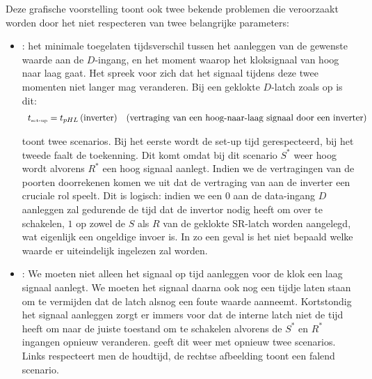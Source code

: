 Deze grafische voorstelling toont ook twee bekende problemen die veroorzaakt worden door het niet respecteren van twee belangrijke parameters:
\begin{itemize}
 \item {}: het minimale toegelaten tijdsverschil tussen het aanleggen van de gewenste waarde aan de $D$-ingang, en het moment waarop het kloksignaal van hoog naar laag gaat. Het spreek voor zich dat het signaal tijdens deze twee momenten niet langer mag veranderen. Bij een geklokte $D$-latch zoals op  is dit:
\begin{equation}
\begin{array}{cr}
t_{\mbox{\tiny{set-up}}}=t_{pHL}\left(\mbox{inverter}\right)&\mbox{(vertraging van een hoog-naar-laag signaal door een inverter)}
\end{array}
\end{equation}

 toont twee scenarios. Bij het eerste wordt de set-up tijd gerespecteerd, bij het tweede faalt de toekenning. Dit komt omdat bij dit scenario $S^*$ weer hoog wordt alvorens $R^*$ een hoog signaal aanlegt. Indien we de vertragingen van de poorten doorrekenen komen we uit dat de vertraging van aan de inverter een cruciale rol speelt. Dit is logisch: indien we een $0$ aan de data-ingang $D$ aanleggen zal gedurende de tijd dat de invertor nodig heeft om over te schakelen, $1$ op zowel de $S$ als $R$ van de geklokte SR-latch worden aangelegd, wat eigenlijk een ongeldige invoer is. In zo een geval is het niet bepaald welke waarde er uiteindelijk ingelezen zal worden.
 \item {}: We moeten niet alleen het signaal op tijd aanleggen voor de klok een laag signaal aanlegt. We moeten het signaal daarna ook nog een tijdje laten staan om te vermijden dat de latch alsnog een foute waarde aanneemt. Kortstondig het signaal aanleggen zorgt er immers voor dat de interne latch niet de tijd heeft om naar de juiste toestand om te schakelen alvorens de $S^*$ en $R^*$ ingangen opnieuw veranderen.  geeft dit weer met opnieuw twee scenarios. Links respecteert men de houdtijd, de rechtse afbeelding toont een falend scenario.
\end{itemize}

